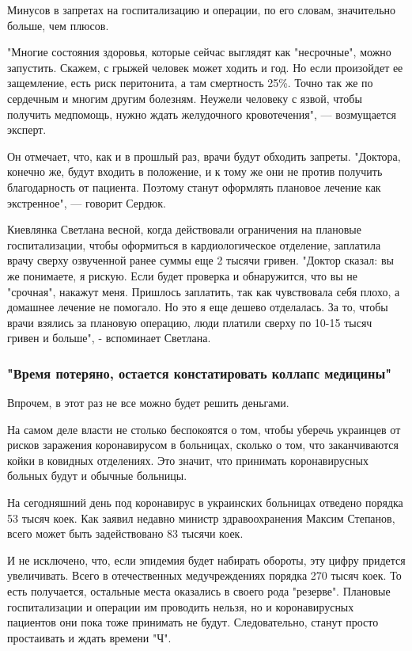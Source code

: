Минусов в запретах на госпитализацию и операции, по его словам, значительно больше, чем плюсов.

"Многие состояния здоровья, которые сейчас выглядят как "несрочные", можно
запустить. Скажем, с грыжей человек может ходить и год. Но если произойдет ее
защемление, есть риск перитонита, а там смертность 25\%. Точно так же по
сердечным и многим другим болезням. Неужели человеку с язвой, чтобы получить
медпомощь, нужно ждать желудочного кровотечения", — возмущается эксперт.

Он отмечает, что, как и в прошлый раз, врачи будут обходить запреты. "Доктора,
конечно же, будут входить в положение, и к тому же они не против получить
благодарность от пациента. Поэтому станут оформлять плановое лечение как
экстренное", — говорит Сердюк.

Киевлянка Светлана весной, когда  действовали ограничения на плановые
госпитализации, чтобы оформиться в кардиологическое отделение, заплатила врачу
сверху озвученной ранее суммы еще 2 тысячи гривен. "Доктор сказал: вы же
понимаете, я рискую. Если будет проверка и обнаружится, что вы не "срочная",
накажут меня. Пришлось заплатить, так как чувствовала себя плохо, а домашнее
лечение не помогало. Но это я еще дешево отделалась. За то, чтобы врачи взялись
за плановую операцию, люди платили сверху по 10-15 тысяч гривен и больше", -
вспоминает Светлана. 

\subsubsection{"Время потеряно, остается констатировать коллапс медицины"}

Впрочем, в этот раз не все можно будет решить деньгами.

На самом деле власти не столько беспокоятся о том, чтобы уберечь украинцев от
рисков заражения коронавирусом в больницах, сколько о том, что заканчиваются
койки в ковидных отделениях. Это значит, что принимать коронавирусных больных
будут и обычные больницы.

На сегодняшний день под коронавирус в украинских больницах отведено порядка 53
тысяч коек. Как заявил недавно министр здравоохранения Максим Степанов, всего
может быть задействовано 83 тысячи коек. 

И не исключено, что, если эпидемия будет набирать обороты, эту цифру придется
увеличивать. Всего в отечественных медучреждениях порядка 270 тысяч коек. То
есть получается, остальные места оказались в своего рода "резерве". Плановые
госпитализации и операции им проводить нельзя, но и коронавирусных пациентов
они пока тоже принимать не будут. Следовательно, станут просто простаивать и
ждать времени "Ч".

